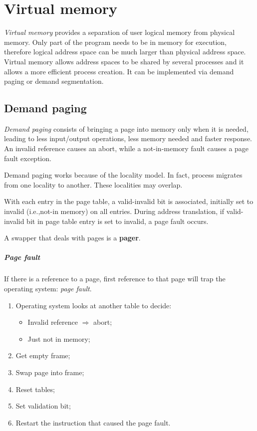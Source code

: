 \chapter{Virtual memory}
\emph{Virtual memory} provides a separation of user logical memory from physical memory. Only part of the program needs to be in memory for execution, therefore logical address space can be much larger than physical address space. Virtual memory allows address spaces to be shared by several processes and it allows a more efficient process creation. It can be implemented via demand paging or demand segmentation.

\section{Demand paging}
\emph{Demand paging} consists of bringing a page into memory only when it is needed, leading to less input/output operations, less memory needed and faster response. An invalid reference causes an abort, while a not-in-memory fault causes a page fault exception.

Demand paging works because of the locality model. In fact, process migrates from one locality to another. These localities may overlap.

With each entry in the page table, a valid-invalid bit is associated, initially set to invalid (i.e.,\@ not-in memory) on all entries. During address translation, if valid-invalid bit in page table entry is set to invalid, a page fault occurs.

A swapper that deals with pages is a \textbf{pager}.

\paragraph{Page fault}
If there is a reference to a page, first reference to that page will trap the operating system: \emph{page fault}.
\begin{enumerate}
\item Operating system looks at another table to decide:
\begin{itemize}
\item Invalid reference $\Rightarrow$ abort;
\item Just not in memory;
\end{itemize}
\item Get empty frame;
\item Swap page into frame;
\item Reset tables;
\item Set validation bit;
\item Restart the instruction that caused the page fault.
\end{enumerate}

